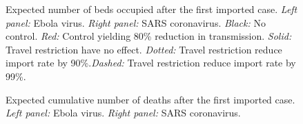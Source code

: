 \documentclass[12pt]{article}
\begin{document}
\begin{figure}[th]
\begin{center}
\end{center}
\caption{Expected number of beds occupied after the first imported case.
\emph{Left panel:} Ebola virus.
\emph{Right panel:} SARS coronavirus.
\emph{Black:} No control.
\emph{Red:} Control yielding 80\% reduction in transmission.
\emph{Solid:} Travel restriction have no effect.
\emph{Dotted:} Travel restriction reduce import rate by 90\%.\emph{Dashed:} Travel restriction reduce import rate by 99\%.
}
\label{F:beds}
\end{figure}

\begin{figure}[th]
\begin{center}
\end{center}
\caption{Expected cumulative number of deaths after the first imported case.
\emph{Left panel:} Ebola virus.
\emph{Right panel:} SARS coronavirus.
}
\label{F:deaths}
\end{figure}
\end{document}
